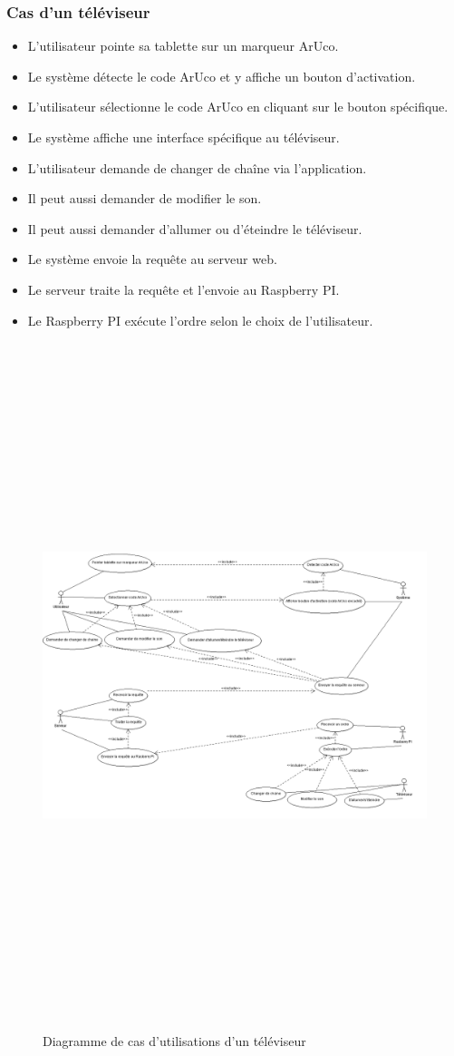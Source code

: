 \documentclass[12pt,a4paper]{article}
\begin{document}
\subsubsection{Cas d'un téléviseur}
\begin{itemize} 
  \item L'utilisateur pointe sa tablette sur un marqueur ArUco.
  \item Le système détecte le code ArUco et y affiche un bouton d'activation. 
  \item L'utilisateur sélectionne le code ArUco en cliquant sur le bouton spécifique.
  \item Le système affiche une interface spécifique au téléviseur.
  \item L'utilisateur demande de changer de chaîne via l'application.
  \item Il peut aussi demander de modifier le son.
  \item Il peut aussi demander d'allumer ou d'éteindre le téléviseur. 
  \item Le système envoie la requête au serveur web.
  \item Le serveur traite la requête et l'envoie au Raspberry PI.
  \item Le Raspberry PI exécute l'ordre selon le choix de l'utilisateur.
\end{itemize}
\newpage
\begin{figure}[h!]
  \centering
  \includegraphics[width = 15cm,height=20cm]{DCU_Televiseur.png}
  \caption{Diagramme de cas d'utilisations d'un téléviseur}
\end{figure}
 \listoffigures
 \newpage
\end{document}
